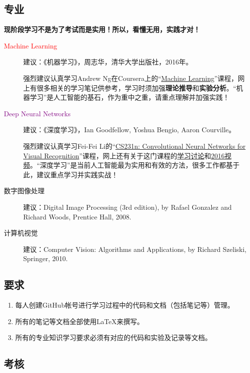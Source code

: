 \documentclass[14pt,a4paper]{extarticle}
\begin{document}
\subsection{专业}

\textbf{现阶段学习不是为了考试而是实用！所以，看懂无用，实践才对！}

\begin{description}
\item[\textcolor{red}{Machine Learning}] 建议：《机器学习》，周志华，清华大学出版社，2016年。

强烈建议认真学习Andrew Ng在Coursera上的“\href{https://www.coursera.org/learn/machine-learning}{Machine Learning}”课程，网上有很多相关的学习笔记供参考，学习时须加强\textbf{理论推导}和\textbf{实验分析}。“机器学习”是人工智能的基石，作为重中之重，请重点理解并加强实践！
\item[\textcolor{purple}{Deep Neural Networks}] 建议：《深度学习》，Ian Goodfellow, Yoshua Bengio, Aaron Courville。

强烈建议认真学习Fei-Fei Li的“\href{http://vision.stanford.edu/teaching.html}{CS231n: Convolutional Neural Networks for Visual Recognition}”课程，网上还有关于这门课程的\href{https://www.reddit.com/r/cs231n/}{学习讨论}和\href{https://www.youtube.com/playlist?list=PLkt2uSq6rBVctENoVBg1TpCC7OQi31AlC}{2016视频}。“深度学习”是当前人工智能最为实用和有效的方法，很多工作都基于此，建议重点学习并实践实战！
\item[数字图像处理] 建议：Digital Image Processing (3rd edition), by Rafael Gonzalez and Richard Woods, Prentice Hall, 2008.
\item[计算机视觉] 建议：Computer Vision: Algorithms and Applications, by Richard Szeliski, Springer, 2010.
\end{description}

\subsection{要求}

\begin{enumerate}
\item 每人创建GitHub帐号进行学习过程中的代码和文档（包括笔记等）管理。
\item 所有的笔记等文档全部使用\LaTeX{}来撰写。
\item 所有的专业知识学习要求必须有对应的代码和实验及记录等文档。
\end{enumerate}

\subsection{考核}
\end{document}
